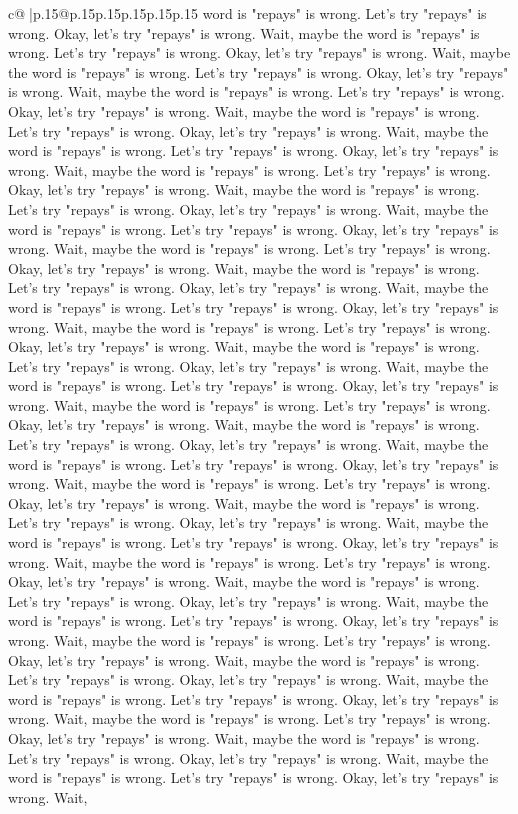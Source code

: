 \documentclass{article}
\begin{document}
{\begin{supertabular}{c@{$\;$}|p{.15\linewidth}@{}p{.15\linewidth}p{.15\linewidth}p{.15\linewidth}p{.15\linewidth}p{.15\linewidth}}
{{{word is "repays" is wrong. Let's try "repays" is wrong. Okay, let's try "repays" is wrong. Wait, maybe the word is "repays" is wrong. Let's try "repays" is wrong. Okay, let's try "repays" is wrong. Wait, maybe the word is "repays" is wrong. Let's try "repays" is wrong. Okay, let's try "repays" is wrong. Wait, maybe the word is "repays" is wrong. Let's try "repays" is wrong. Okay, let's try "repays" is wrong. Wait, maybe the word is "repays" is wrong. Let's try "repays" is wrong. Okay, let's try "repays" is wrong. Wait, maybe the word is "repays" is wrong. Let's try "repays" is wrong. Okay, let's try "repays" is wrong. Wait, maybe the word is "repays" is wrong. Let's try "repays" is wrong. Okay, let's try "repays" is wrong. Wait, maybe the word is "repays" is wrong. Let's try "repays" is wrong. Okay, let's try "repays" is wrong. Wait, maybe the word is "repays" is wrong. Let's try "repays" is wrong. Okay, let's try "repays" is wrong. Wait, maybe the word is "repays" is wrong. Let's try "repays" is wrong. Okay, let's try "repays" is wrong. Wait, maybe the word is "repays" is wrong. Let's try "repays" is wrong. Okay, let's try "repays" is wrong. Wait, maybe the word is "repays" is wrong. Let's try "repays" is wrong. Okay, let's try "repays" is wrong. Wait, maybe the word is "repays" is wrong. Let's try "repays" is wrong. Okay, let's try "repays" is wrong. Wait, maybe the word is "repays" is wrong. Let's try "repays" is wrong. Okay, let's try "repays" is wrong. Wait, maybe the word is "repays" is wrong. Let's try "repays" is wrong. Okay, let's try "repays" is wrong. Wait, maybe the word is "repays" is wrong. Let's try "repays" is wrong. Okay, let's try "repays" is wrong. Wait, maybe the word is "repays" is wrong. Let's try "repays" is wrong. Okay, let's try "repays" is wrong. Wait, maybe the word is "repays" is wrong. Let's try "repays" is wrong. Okay, let's try "repays" is wrong. Wait, maybe the word is "repays" is wrong. Let's try "repays" is wrong. Okay, let's try "repays" is wrong. Wait, maybe the word is "repays" is wrong. Let's try "repays" is wrong. Okay, let's try "repays" is wrong. Wait, maybe the word is "repays" is wrong. Let's try "repays" is wrong. Okay, let's try "repays" is wrong. Wait, maybe the word is "repays" is wrong. Let's try "repays" is wrong. Okay, let's try "repays" is wrong. Wait, maybe the word is "repays" is wrong. Let's try "repays" is wrong. Okay, let's try "repays" is wrong. Wait, maybe the word is "repays" is wrong. Let's try "repays" is wrong. Okay, let's try "repays" is wrong. Wait, maybe the word is "repays" is wrong. Let's try "repays" is wrong. Okay, let's try "repays" is wrong. Wait, maybe the word is "repays" is wrong. Let's try "repays" is wrong. Okay, let's try "repays" is wrong. Wait, maybe the word is "repays" is wrong. Let's try "repays" is wrong. Okay, let's try "repays" is wrong. Wait, maybe the word is "repays" is wrong. Let's try "repays" is wrong. Okay, let's try "repays" is wrong. Wait, maybe the word is "repays" is wrong. Let's try "repays" is wrong. Okay, let's try "repays" is wrong. Wait, maybe the word is "repays" is wrong. Let's try "repays" is wrong. Okay, let's try "repays" is wrong. Wait, }}}
\end{supertabular}}
\end{document}
